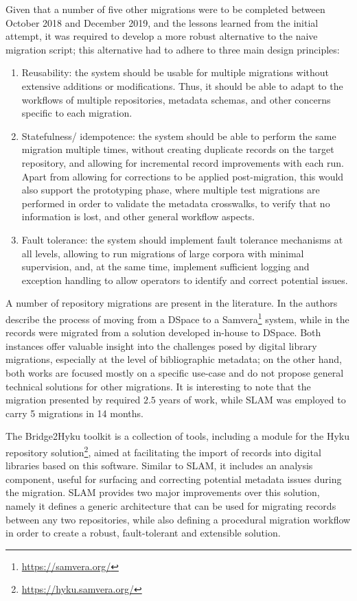 Given that a number of five other migrations were to be completed between October 2018 and December 2019, and the lessons learned from the initial attempt, it was required to develop a more robust alternative to the naive migration script; this alternative had to adhere to three main design principles:
\begin{enumerate}
    \item Reusability: the system should be usable for multiple migrations without extensive additions or modifications. Thus, it should be able to adapt to the workflows of multiple repositories, metadata schemas, and other concerns specific to each migration.
    \item Statefulness/ idempotence: the system should be able to perform the same migration multiple times, without creating duplicate records on the target repository, and allowing for incremental record improvements with each run. Apart from allowing for corrections to be applied post-migration, this would also support the prototyping phase, where multiple test migrations are performed in order to validate the metadata crosswalks, to verify that no information is lost, and other general workflow aspects.
    \item Fault tolerance: the system should implement fault tolerance mechanisms at all levels, allowing to run migrations of large corpora with minimal supervision, and, at the same time, implement sufficient logging and exception handling to allow operators to identify and correct potential issues.
\end{enumerate}

A number of repository migrations are present in the literature. In \cite{tragedy} the authors describe the process of moving from a DSpace to a Samvera\footnote{\url{https://samvera.org/}} system, while in \cite{challenges} the records were migrated from a solution developed in-house to DSpace. Both instances offer valuable insight into the challenges posed by digital library migrations, especially at the level of bibliographic metadata; on the other hand, both works are focused mostly on a specific use-case and do not propose general technical solutions for other migrations. It is interesting to note that the migration presented by \cite{tragedy} required $2.5$ years of work, while SLAM was employed to carry 5 migrations in 14 months.

The Bridge2Hyku toolkit\cite{bridge} is a collection of tools, including a module for the Hyku repository solution\footnote{\url{https://hyku.samvera.org/}}, aimed at facilitating the import of records into digital libraries based on this software. Similar to SLAM, it includes an analysis component, useful for surfacing and correcting potential metadata issues during the migration. SLAM provides two major improvements over this solution, namely it defines a generic architecture that can be used for migrating records between any two repositories, while also defining a procedural migration workflow in order to create a robust, fault-tolerant and extensible solution.

